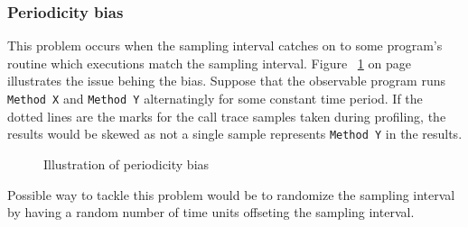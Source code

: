 \documentclass[..thesis.tex]{subfiles}
\begin{document}
\subsubsection{Periodicity bias}
This problem occurs when the sampling interval catches on to some program's routine which executions match the sampling interval. Figure ~\ref{fig:periodicityBias} on page ~\pageref{fig:periodicityBias} illustrates the issue behing the bias. Suppose that the observable program runs \texttt{Method X} and \texttt{Method Y} alternatingly for some constant time period. If the dotted lines are the marks for the call trace samples taken during profiling, the results would be skewed as not a single sample represents \texttt{Method Y} in the results.

\begin{figure}[H]
\centering
{}
\caption{Illustration of periodicity bias}
\label{fig:periodicityBias}
\end{figure}


Possible way to tackle this problem would be to randomize the sampling interval by having a random number of time units offseting the sampling interval. 
\end{document}
